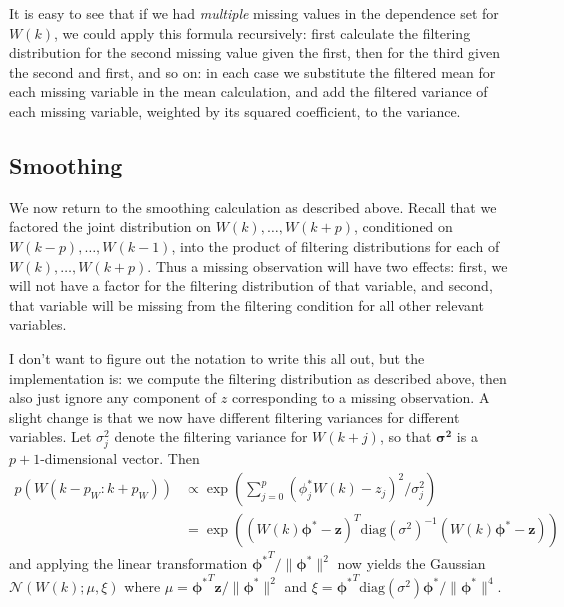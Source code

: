 \documentclass{article}
\newcommand{\N}{\mathcal{N}}
\renewcommand{\v}[1]{\mathbf{#1}}
\begin{document}
It is easy to see that if we had {\em multiple} missing values in the dependence set for $W(k)$, we could apply this formula recursively: first calculate the filtering distribution for the second missing value given the first, then for the third given the second and first, and so on: in each case we substitute the filtered mean for each missing variable in the mean calculation, and add the filtered variance of each missing variable, weighted by its squared coefficient, to the variance.

\subsection{Smoothing}

We now return to the smoothing calculation as described above. Recall that we factored the joint distribution on $W(k), \ldots, W(k+p)$, conditioned on $W(k-p), \ldots, W(k-1)$, into the product of filtering distributions for each of $W(k), \ldots, W(k+p)$. Thus a missing observation will have two effects: first, we will not have a factor for the filtering distribution of that variable, and second, that variable will be missing from the filtering condition for all other relevant variables.

I don't want to figure out the notation to write this all out, but the implementation is: we compute the filtering distribution as described above, then also just ignore any component of $z$ corresponding to a missing observation. A slight change is that we now have different filtering variances for different variables. Let $\sigma^2_j$ denote the filtering variance for $W(k+j)$, so that $\v{\sigma^2}$ is a $p+1$-dimensional vector. Then
\begin{align*}
p(W(k-p_W : k+p_W)) & \propto \exp\left( \sum_{j=0}^p \left(\phi^*_j W(k) - z_j \right)^2  / \sigma_j^2 \right)\\
&= \exp\left( ( W(k) \v{\phi^*} - \v{z})^T \text{diag}(\sigma^2)^{-1}  ( W(k) \v{\phi^*} - \v{z}) \right)
\end{align*}
and applying the linear transformation $\v{\phi^*}^T / \|\v{\phi^*}\|^2$ now yields the Gaussian $\N\left(W(k); \mu,   \xi   \right)$  where $\mu = \v{\phi^*}^T\v{z} /  \|\v{\phi^*}\|^2$ and $\xi = \v{\phi^*}^T  \text{diag}(\sigma^2) \v{\phi^*} / \| \v{\phi^*}\|^4$.
\end{document}
